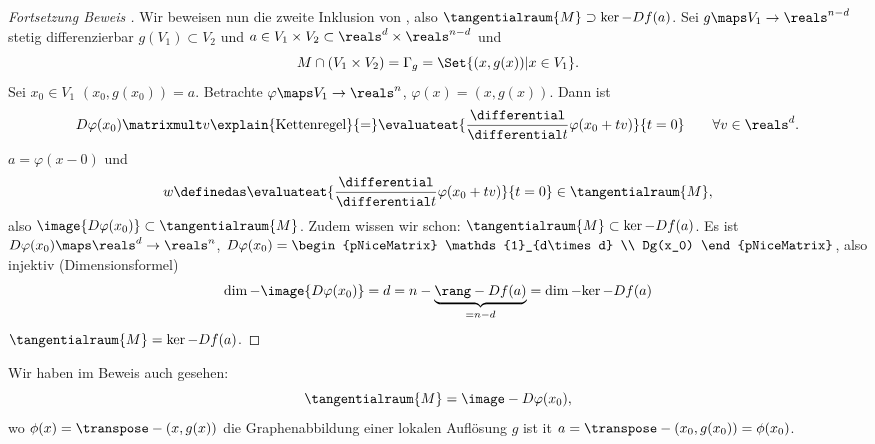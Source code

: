 \begin{proof}[Fortsetzung Beweis ]
  Wir beweisen nun die zweite Inklusion von , also \( \tangentialraum{M}\supset \ker-{Df(a)} \). Sei \( g\maps V_1\to \reals^{n-d} \) stetig differenzierbar \sd \( g(V_1)\subset V_2 \) und \( a\in V_1\times V_2\subset \reals^d \times \reals^{n-d} \) und
\begin{equation*}
  M\cap (V_1\times V_2)=\Gamma_g=\Set{(x,g(x))|x\in V_1}.
\end{equation*}
Sei \( x_0\in V_1  \) \sd \( (x_0,g(x_0))=a \). Betrachte \( \varphi\maps V_1\to \reals^n \), \( \varphi(x)=(x,g(x)) \). Dann ist
\begin{equation*}
  D\varphi(x_0)\matrixmult v\explain{\text{Kettenregel}}{=}\evaluateat{\frac{\differential}{\differential t} \varphi(x_0+tv)}{t=0}\qquad \forall v\in \reals^d.
\end{equation*}
\timplies \( a=\varphi(x-0) \) und 
\begin{equation*}
  w\definedas \evaluateat{\frac{\differential}{\differential t} \varphi(x_0+tv)}{t=0}\in \tangentialraum{M},
\end{equation*}
also \( \image{D\varphi(x_0)}\subset \tangentialraum{M} \). Zudem wissen wir schon: \( \tangentialraum{M}\subset \ker-{Df(a)} \). Es ist \( D\varphi(x_0)\maps \reals^d\to \reals^n \), \( D\varphi(x_0)=\begin{pNiceMatrix} \mathds{1}_{d\times d} \\ Dg(x_0) \end{pNiceMatrix} \), also injektiv \timplies (Dimensionsformel)
\begin{equation*}
  \dim-{\image{D\varphi(x_0)}}=d=n-\underbrace{\rang-{Df(a)}}_{=n-d}=\dim-{\ker-{Df(a)}}
\end{equation*}
\timplies \( \tangentialraum{M}=\ker-{Df(a)} \).
\end{proof}
Wir haben im Beweis auch gesehen:
\begin{equation*}
  \tangentialraum{M}=\image-{D\varphi(x_0)},
\end{equation*}
wo \( \phi(x)=\transpose-{(x,g(x))} \) die Graphenabbildung einer lokalen Auflösung \( g \) ist it \( a=\transpose-{(x_0,g(x_0))}=\phi(x_0) \).

